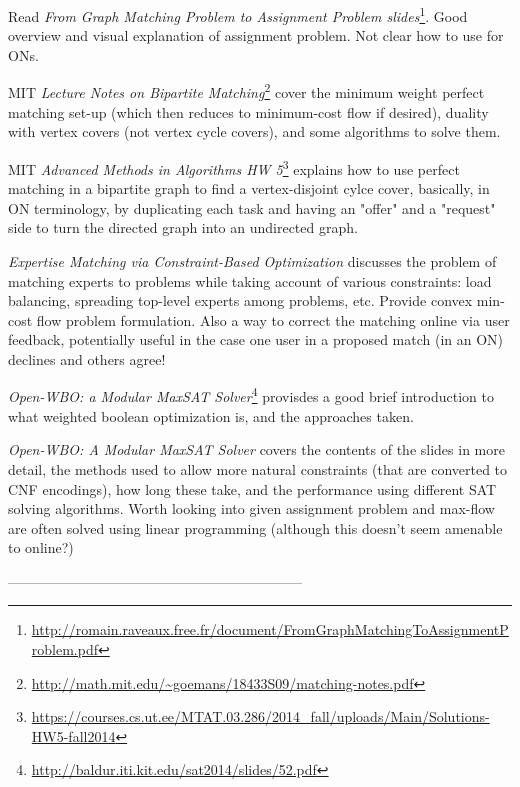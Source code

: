 \documentclass[
11pt, %
a4paper, %
oneside, %
headinclude,footinclude, %
BCOR5mm, %
]{scrartcl}
\begin{document}
Read \textit{From Graph Matching Problem to Assignment Problem slides}\footnote{ \url{http://romain.raveaux.free.fr/document/FromGraphMatchingToAssignmentProblem.pdf}}. Good overview and visual explanation of assignment problem. Not clear how to use for ONs.

MIT \textit{Lecture Notes on Bipartite Matching}\footnote{\url{http://math.mit.edu/~goemans/18433S09/matching-notes.pdf}} cover the minimum weight perfect matching set-up (which then reduces to minimum-cost flow if desired), duality with vertex covers (not vertex cycle covers), and some algorithms to solve them.

MIT \textit{Advanced Methods in Algorithms HW 5}\footnote{\url{https://courses.cs.ut.ee/MTAT.03.286/2014_fall/uploads/Main/Solutions-HW5-fall2014}} explains how to use perfect matching in a bipartite graph to find a vertex-disjoint cylce cover, basically, in ON terminology, by duplicating each task and having an "offer" and a "request" side to turn the directed graph into an undirected graph.

\textit{Expertise Matching via Constraint-Based Optimization} \cite{Tan1} discusses the problem of matching experts to problems while taking account of various constraints: load balancing, spreading top-level experts among problems, etc. Provide convex min-cost flow problem formulation. Also a way to correct the matching online via user feedback, potentially useful in the case one user in a proposed match (in an ON) declines and others agree!

\textit{Open-WBO: a Modular MaxSAT Solver}\footnote{\url{http://baldur.iti.kit.edu/sat2014/slides/52.pdf}} provisdes a good brief introduction to what weighted boolean optimization is, and the approaches taken.

\textit{Open-WBO: A Modular MaxSAT Solver} covers the contents of the slides in more detail, the methods used to allow more natural constraints (that are converted to CNF encodings), how long these take, and the performance using different SAT solving algorithms. Worth looking into given assignment problem and max-flow are often solved using linear programming (although this doesn't seem amenable to online?)

---------------------------------------------------------------

\renewcommand{\refname}{\spacedlowsmallcaps{References}} %




\end{document}
